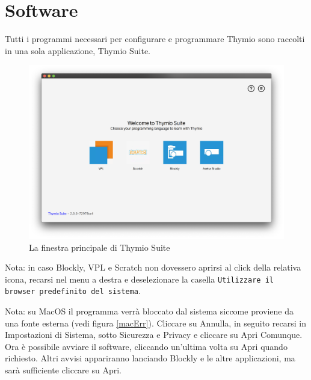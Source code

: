 \documentclass[12pt]{article}
\begin{document}
\newpage

\section{Software}

	Tutti i programmi necessari per configurare e programmare Thymio sono raccolti in una sola applicazione, Thymio Suite.
	
	\begin{figure}[H]
		\includegraphics[width=\textwidth]{img/thymioSuite.png}
		\caption{La finestra principale di Thymio Suite}
		\label{aseba1}
	\end{figure}
	
	Nota: in caso Blockly, VPL e Scratch non dovessero aprirsi al click della relativa icona, recarsi nel menu a destra e deselezionare la casella \texttt{Utilizzare il browser predefinito del sistema}.
	
	\newpage
	
	Nota: su MacOS il programma verrà bloccato dal sistema siccome proviene da una fonte esterna (vedi figura \ref{macErr}). Cliccare su Annulla, in seguito recarsi in Impostazioni di Sistema, sotto Sicurezza e Privacy e cliccare su Apri Comunque. Ora è possibile avviare il software, cliccando un'ultima volta su Apri quando richiesto. Altri avvisi appariranno lanciando Blockly e le altre applicazioni, ma sarà sufficiente cliccare su Apri.
		
\end{document}
